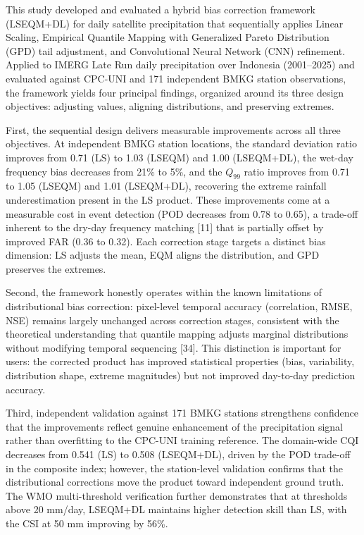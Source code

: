 \documentclass[
]{article}
\begin{document}
This study developed and evaluated a hybrid bias correction framework
(LSEQM+DL) for daily satellite precipitation that sequentially applies
Linear Scaling, Empirical Quantile Mapping with Generalized Pareto
Distribution (GPD) tail adjustment, and Convolutional Neural Network
(CNN) refinement. Applied to IMERG Late Run daily precipitation over
Indonesia (2001--2025) and evaluated against CPC-UNI and 171 independent
BMKG station observations, the framework yields four principal findings,
organized around its three design objectives: adjusting values, aligning
distributions, and preserving extremes.

First, the sequential design delivers measurable improvements across all
three objectives. At independent BMKG station locations, the standard
deviation ratio improves from 0.71 (LS) to 1.03 (LSEQM) and 1.00
(LSEQM+DL), the wet-day frequency bias decreases from 21\% to 5\%, and
the \(Q_{99}\) ratio improves from 0.71 to 1.05 (LSEQM) and 1.01
(LSEQM+DL), recovering the extreme rainfall underestimation present in
the LS product. These improvements come at a measurable cost in event
detection (POD decreases from 0.78 to 0.65), a trade-off inherent to the
dry-day frequency matching {[}11{]} that is partially offset by improved
FAR (0.36 to 0.32). Each correction stage targets a distinct bias
dimension: LS adjusts the mean, EQM aligns the distribution, and GPD
preserves the extremes.

Second, the framework honestly operates within the known limitations of
distributional bias correction: pixel-level temporal accuracy
(correlation, RMSE, NSE) remains largely unchanged across correction
stages, consistent with the theoretical understanding that quantile
mapping adjusts marginal distributions without modifying temporal
sequencing {[}34{]}. This distinction is important for users: the
corrected product has improved statistical properties (bias,
variability, distribution shape, extreme magnitudes) but not improved
day-to-day prediction accuracy.

Third, independent validation against 171 BMKG stations strengthens
confidence that the improvements reflect genuine enhancement of the
precipitation signal rather than overfitting to the CPC-UNI training
reference. The domain-wide CQI decreases from 0.541 (LS) to 0.508
(LSEQM+DL), driven by the POD trade-off in the composite index; however,
the station-level validation confirms that the distributional
corrections move the product toward independent ground truth. The WMO
multi-threshold verification further demonstrates that at thresholds
above 20 mm/day, LSEQM+DL maintains higher detection skill than LS, with
the CSI at 50 mm improving by 56\%.
\end{document}
